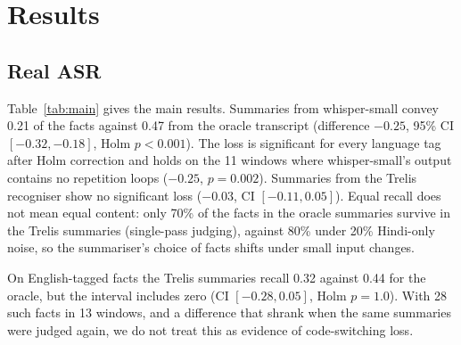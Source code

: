 \documentclass[conference]{IEEEtran}
\begin{document}
\section{Results}
\subsection{Real ASR}
Table~\ref{tab:main} gives the main results. Summaries from whisper-small convey 0.21 of the facts against 0.47 from the oracle transcript (difference $-0.25$, 95\% CI $[-0.32, -0.18]$, Holm $p < 0.001$). The loss is significant for every language tag after Holm correction and holds on the 11 windows where whisper-small's output contains no repetition loops ($-0.25$, $p = 0.002$). Summaries from the Trelis recogniser show no significant loss ($-0.03$, CI $[-0.11, 0.05]$). Equal recall does not mean equal content: only 70\% of the facts in the oracle summaries survive in the Trelis summaries (single-pass judging), against 80\% under 20\% Hindi-only noise, so the summariser's choice of facts shifts under small input changes.

On English-tagged facts the Trelis summaries recall 0.32 against 0.44 for the oracle, but the interval includes zero (CI $[-0.28, 0.05]$, Holm $p = 1.0$). With 28 such facts in 13 windows, and a difference that shrank when the same summaries were judged again, we do not treat this as evidence of code-switching loss.
\end{document}
